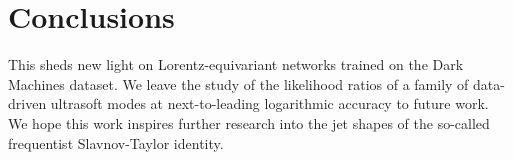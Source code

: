 \section{Conclusions}\label{sec:conclusions}

This sheds new light on Lorentz-equivariant networks trained on the Dark
Machines dataset. We leave the study of the likelihood ratios of a
family of data-driven ultrasoft modes at next-to-leading logarithmic
accuracy to future work. We hope this work inspires further research
into the jet shapes of the so-called frequentist Slavnov-Taylor
identity.

